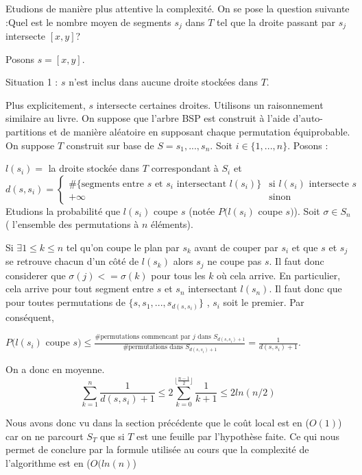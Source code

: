 Etudions de manière plus attentive la complexité. On se pose la
question suivante :\og Quel est le nombre moyen de segments
$s_j$ dans $T$ tel que la droite passant par $s_j$ intersecte
$[x,y]$?\fg


Posons $s = [x,y]$.

Situation 1 : $s$ n'est inclus dans aucune droite stockées dans $T$.

Plus explicitement, $s$ intersecte certaines droites. Utilisons un raisonnement similaire
au livre. On suppose que l'arbre BSP est construit à l'aide d'auto-partitions et de
manière aléatoire en supposant chaque permutation équiprobable.
On suppose $T$ construit sur base de $S = {s_1,...,s_n}$. Soit $ i \in \{1,...,n\}$.
Posons :

$l(s_i) =$ la droite stockée dans $T$ correspondant à $S_i$ et
$$ d(s,s_i )= \begin{cases} \mbox{\#\{segments entre } s \mbox{ et } s_i
\mbox{ intersectant } l(s_i) \mbox{\}}
&\mbox{si } l(s_i) \mbox { intersecte } s \\ +\infty & \mbox{sinon} \end{cases} $$
Etudions la probabilité que $l(s_i)$ coupe $s$ (notée $P(l(s_i)$ coupe $s)$).
Soit $\sigma  \in S_n $( l'ensemble des permutations à $n$ éléments).

Si $ \exists 1 \le  k \le n $ tel qu'on coupe le plan par $s_k$ avant de couper par $s_i$ et que $s$ et $s_j$ se retrouve chacun d'un côté de $l(s_k)$ alors $s_j$ ne coupe pas $s$.
Il faut donc considerer que $\sigma (j) <= \sigma (k)$ pour tous les $k$ où cela arrive.
En particulier, cela arrive pour tout segment entre $s$ et $s_n$ intersectant $l(s_n)$.
Il faut donc que pour toutes permutations de $\{ s, s_1,...,s_{d(s,s_i)} \}$ , $s_i$ soit le premier.
Par conséquent, 

$P(l(s_i)$ coupe $s) \le
\frac {\# \mbox {permutations commencant par } j \mbox{ dans } S_{d(s,s_i)+1}}
{\# \mbox {permutations dans } S_{d(s,s_i)+1}} = \frac 1 {d(s,s_i)+1}$.

On a donc en moyenne. $$\sum_{k=1}^{n} \frac 1 {d(s,s_i)+1}        \le 2 \sum_{k=0}^{\lfloor \frac {n-1} 2 \rfloor}  \frac 1{k+1} \le 2 ln (n/2) $$


Nous avons donc vu dans la section précédente que le coût local est en ($O(1)$) car on ne parcourt $S_T$ que si $T$ est une feuille par l'hypothèse faite.
Ce qui nous permet de conclure par la formule utilisée au cours que la complexité
de l'algorithme est en ($O(ln(n)$)




